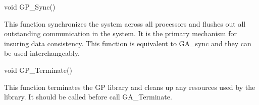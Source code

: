 \documentclass[12pt]{article}
\begin{document}


\begin{capi}
\begin{ccode}
void GP\_Sync()
\end{ccode}
\end{capi}

\local

\begin{desc}

This function synchronizes the system across all processors and flushes out all
outstanding communication in the system. It is the primary mechanism for
insuring data consistency. This function is equivalent to GA\_sync and they can
be used interchangeably.

\end{desc}


\begin{capi}
\begin{ccode}
void GP\_Terminate()
\end{ccode}
\end{capi}

\local

\begin{desc}

This function terminates the GP library and cleans up any resources used by the
library. It should be called before call GA\_Terminate.

\end{desc}
\end{document}
